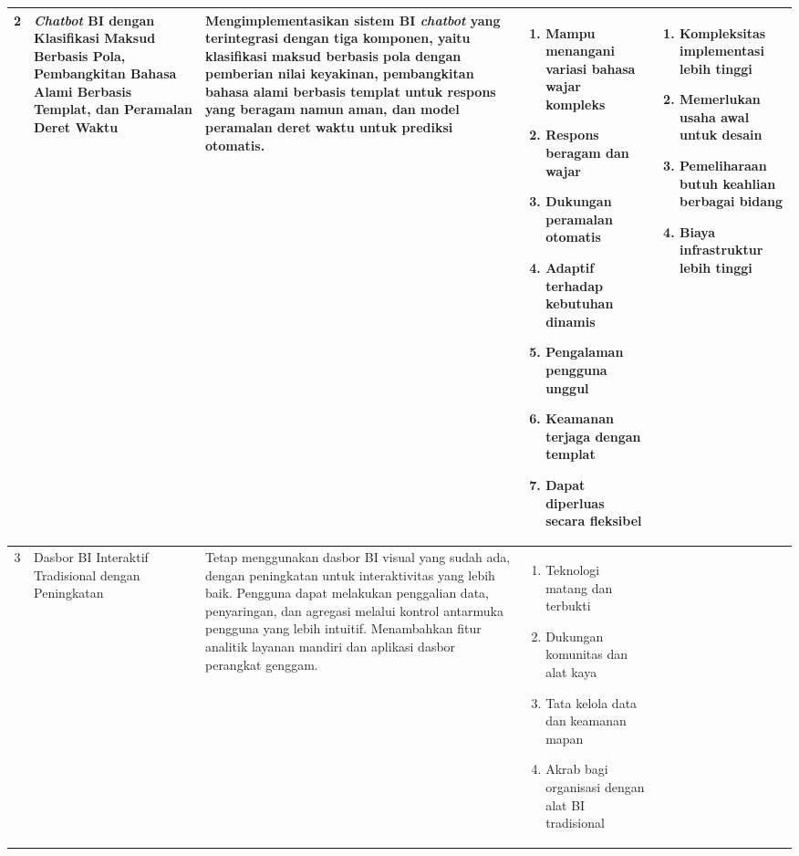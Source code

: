 \begin{longtable}{|c|p{2cm}|p{3.65cm}|p{2.7cm}|p{3cm}|}
2 & 
\textit{Chatbot} BI dengan Klasifikasi Maksud Berbasis Pola, Pembangkitan Bahasa Alami Berbasis Templat, dan Peramalan Deret Waktu & 
Mengimplementasikan sistem BI \textit{chatbot} yang terintegrasi dengan tiga komponen, yaitu klasifikasi maksud berbasis pola dengan pemberian nilai keyakinan, pembangkitan bahasa alami berbasis templat untuk respons yang beragam namun aman, dan model peramalan deret waktu untuk prediksi otomatis. & 

\begin{enumerate}[leftmargin=*, nosep, noitemsep]
\item Mampu menangani variasi bahasa wajar kompleks
\item Respons beragam dan wajar
\item Dukungan peramalan otomatis
\item Adaptif terhadap kebutuhan dinamis
\item Pengalaman pengguna unggul
\item Keamanan terjaga dengan templat
\item Dapat diperluas secara fleksibel
\end{enumerate} & 

\begin{enumerate}[leftmargin=*, nosep, noitemsep]
\item Kompleksitas implementasi lebih tinggi
\item Memerlukan usaha awal untuk desain
\item Pemeliharaan butuh keahlian berbagai bidang
\item Biaya infrastruktur lebih tinggi
\end{enumerate} \\
\hline

3 & 
Dasbor BI Interaktif Tradisional dengan Peningkatan & 
Tetap menggunakan dasbor BI visual yang sudah ada, dengan peningkatan untuk interaktivitas yang lebih baik. Pengguna dapat melakukan penggalian data, penyaringan, dan agregasi melalui kontrol antarmuka pengguna yang lebih intuitif. Menambahkan fitur analitik layanan mandiri dan aplikasi dasbor perangkat genggam. & 

\begin{enumerate}[leftmargin=*, nosep, noitemsep]
\item Teknologi matang dan terbukti
\item Dukungan komunitas dan alat kaya
\item Tata kelola data dan keamanan mapan
\item Akrab bagi organisasi dengan alat BI tradisional
\end{enumerate} & 


\end{longtable}
